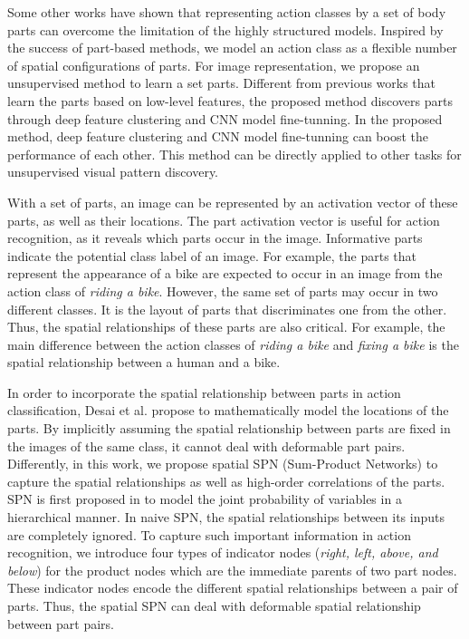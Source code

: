 \documentclass[journal]{IEEEtran}
\begin{document}
Some other works \cite{Yao11humanaction__Stanford40,MajiActionCVPR11,sharma:CVPR2013,BourdevMalikICCV09,Yao_modeling_mutual_2010_CVPR} have shown that representing action classes by a set of body parts can overcome the limitation of the highly structured models.
Inspired by the success of part-based methods, we model an action class as a flexible number of spatial configurations of parts.
For image representation, we propose an unsupervised method to learn a set parts. Different from previous works that learn the parts based on low-level features, the proposed method discovers parts through deep feature clustering and CNN model fine-tunning.
In the proposed method, deep feature clustering and CNN model fine-tunning can boost the performance of each other. This method can be directly applied to other tasks for unsupervised visual pattern discovery.


With a set of parts, an image can be represented by an activation vector of these parts, as well as their locations. The part activation vector is useful for action recognition, as it reveals which parts occur in the image. Informative parts indicate the potential class label of an image. For example, the parts that represent the appearance of a bike are expected to occur in an image from the action class of \textit{riding a bike}.
However, the same set of parts may occur in two different classes. It is the layout of parts that discriminates one from the other.
Thus, the spatial relationships of these parts are also critical.
For example, the main difference between the action classes of \textit{riding a bike} and \textit{fixing a bike} is the spatial relationship between a human and a bike.




In order to incorporate the spatial relationship between parts in action classification, Desai et al. \cite{desai10_action} propose to mathematically model the locations of the parts. By implicitly assuming the spatial relationship between parts are fixed in the images of the same class, it cannot deal with deformable part pairs.
Differently, in this work, we propose spatial SPN (Sum-Product Networks) to capture the spatial relationships as well as high-order correlations of the parts.
SPN is first proposed in \cite{poon2011SPNIntroduce} to model the joint probability of variables in a hierarchical manner. In naive SPN, the spatial relationships between its inputs are completely ignored. To capture such important information in action recognition, we introduce four types of indicator nodes (\textit{right, left, above, and below}) for the product nodes which are the immediate parents of two part nodes. These indicator nodes encode the different spatial relationships between a pair of parts. Thus, the spatial SPN can deal with deformable spatial relationship between part pairs.
\end{document}
